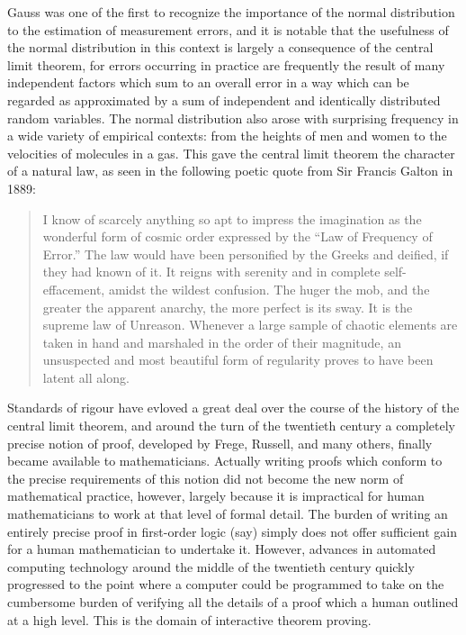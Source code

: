 \documentclass{amsart}
\theoremstyle{definition}
\theoremstyle{remark}
\begin{document}
Gauss was one of the first to recognize the importance of the normal distribution to the estimation of measurement errors, and it is notable that the usefulness of the normal distribution in this context is largely a consequence of the central limit theorem, for errors occurring in practice are frequently the result of many independent factors which sum to an overall error in a way which can be regarded as approximated by a sum of independent and identically distributed random variables. The normal distribution also arose with surprising frequency in a wide variety of empirical contexts: from the heights of men and women to the velocities of molecules in a gas. This gave the central limit theorem the character of a natural law, as seen in the following poetic quote from Sir Francis Galton in 1889:
\begin{quote}
 I know of scarcely anything so apt to impress the imagination as the wonderful form of cosmic order expressed by the ``Law of Frequency of Error.'' The law would have been personified by the Greeks and deified, if they had known of it. It reigns with serenity and in complete self-effacement, amidst the wildest confusion. The huger the mob, and the greater the apparent anarchy, the more perfect is its sway. It is the supreme law of Unreason. Whenever a large sample of chaotic elements are taken in hand and marshaled in the order of their magnitude, an unsuspected and most beautiful form of regularity proves to have been latent all along.
\end{quote}

Standards of rigour have evloved a great deal over the course of the history of the central limit theorem, and around the turn of the twentieth century a completely precise notion of proof, developed by Frege, Russell, and many others, finally became available to mathematicians. Actually writing proofs which conform to the precise requirements of this notion did not become the new norm of mathematical practice, however, largely because it is impractical for human mathematicians to work at that level of formal detail. The burden of writing an entirely precise proof in first-order logic (say) simply does not offer sufficient gain for a human mathematician to undertake it. However, advances in automated computing technology around the middle of the twentieth century quickly progressed to the point where a computer could be programmed to take on the cumbersome burden of verifying all the details of a proof which a human outlined at a high level. This is the domain of interactive theorem proving.
\end{document}
